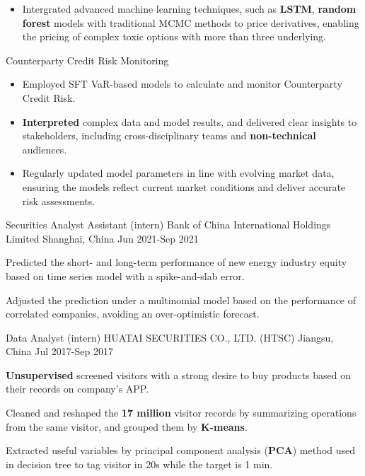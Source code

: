 \begin{cventries}
{\begin{cvitems}
\begin{itemize}
          \item Intergrated advanced machine learning techniques, such as \textbf{LSTM}, \textbf{random forest} models with traditional MCMC methods to price derivatives, enabling the pricing of complex toxic options with more than three underlying.
        \end{itemize}
        \item Counterparty Credit Risk Monitoring
        \begin{itemize}
          \item Employed SFT VaR-based models to calculate and monitor Counterparty Credit Risk.
          \item \textbf{Interpreted} complex data and model results, and delivered clear insights to stakeholders, including cross-disciplinary teams and \textbf{non-technical} audiences.
          \item Regularly updated model parameters in line with evolving market data, ensuring the models reflect current market conditions and deliver accurate risk assessments.
        \end{itemize}
      \end{cvitems}
    }


  \cventry
    {Securities Analyst Assistant (intern)} %
    {Bank of China International Holdings Limited} %
    {Shanghai, China} %
    {Jun 2021-Sep 2021} %
    {
      \begin{cvitems} %
        \item {Predicted the short- and long-term performance of new energy industry equity based on time series model with a spike-and-slab error.}
        \item {Adjusted the prediction under a multinomial model based on the performance of correlated companies, avoiding an over-optimistic forecast.}
      \end{cvitems}
    }

  \cventry
    {Data Analyst (intern)} %
    {HUATAI SECURITIES CO., LTD. (HTSC)} %
    {Jiangsu, China} %
    {Jul 2017-Sep 2017} %
    {
      \begin{cvitems} %
        \item {\textbf{Unsupervised} screened visitors with a strong desire to buy products based on their records on company’s APP.}
        \item {Cleaned and reshaped the \textbf{17 million} visitor records by summarizing operations from the same visitor, and grouped them by \textbf{K-means}.}
        \item {Extracted useful variables by principal component analysis (\textbf{PCA}) method used in decision tree to tag visitor in 20s while the target is 1 min.}
      \end{cvitems}
    }



\end{cventries}
